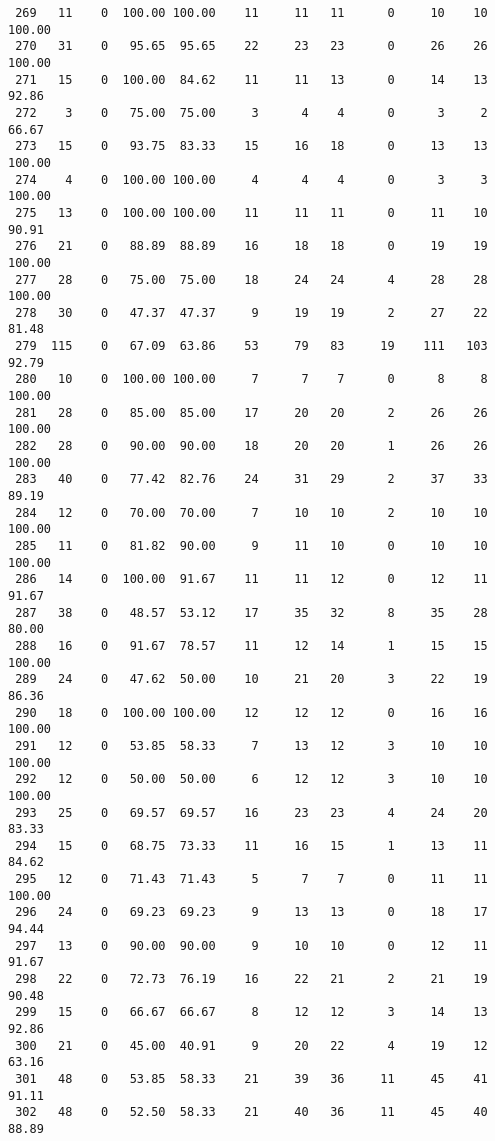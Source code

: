 \begin{verbatim}
 269   11    0  100.00 100.00    11     11   11      0     10    10   100.00
 270   31    0   95.65  95.65    22     23   23      0     26    26   100.00
 271   15    0  100.00  84.62    11     11   13      0     14    13    92.86
 272    3    0   75.00  75.00     3      4    4      0      3     2    66.67
 273   15    0   93.75  83.33    15     16   18      0     13    13   100.00
 274    4    0  100.00 100.00     4      4    4      0      3     3   100.00
 275   13    0  100.00 100.00    11     11   11      0     11    10    90.91
 276   21    0   88.89  88.89    16     18   18      0     19    19   100.00
 277   28    0   75.00  75.00    18     24   24      4     28    28   100.00
 278   30    0   47.37  47.37     9     19   19      2     27    22    81.48
 279  115    0   67.09  63.86    53     79   83     19    111   103    92.79
 280   10    0  100.00 100.00     7      7    7      0      8     8   100.00
 281   28    0   85.00  85.00    17     20   20      2     26    26   100.00
 282   28    0   90.00  90.00    18     20   20      1     26    26   100.00
 283   40    0   77.42  82.76    24     31   29      2     37    33    89.19
 284   12    0   70.00  70.00     7     10   10      2     10    10   100.00
 285   11    0   81.82  90.00     9     11   10      0     10    10   100.00
 286   14    0  100.00  91.67    11     11   12      0     12    11    91.67
 287   38    0   48.57  53.12    17     35   32      8     35    28    80.00
 288   16    0   91.67  78.57    11     12   14      1     15    15   100.00
 289   24    0   47.62  50.00    10     21   20      3     22    19    86.36
 290   18    0  100.00 100.00    12     12   12      0     16    16   100.00
 291   12    0   53.85  58.33     7     13   12      3     10    10   100.00
 292   12    0   50.00  50.00     6     12   12      3     10    10   100.00
 293   25    0   69.57  69.57    16     23   23      4     24    20    83.33
 294   15    0   68.75  73.33    11     16   15      1     13    11    84.62
 295   12    0   71.43  71.43     5      7    7      0     11    11   100.00
 296   24    0   69.23  69.23     9     13   13      0     18    17    94.44
 297   13    0   90.00  90.00     9     10   10      0     12    11    91.67
 298   22    0   72.73  76.19    16     22   21      2     21    19    90.48
 299   15    0   66.67  66.67     8     12   12      3     14    13    92.86
 300   21    0   45.00  40.91     9     20   22      4     19    12    63.16
 301   48    0   53.85  58.33    21     39   36     11     45    41    91.11
 302   48    0   52.50  58.33    21     40   36     11     45    40    88.89

\end{verbatim}
